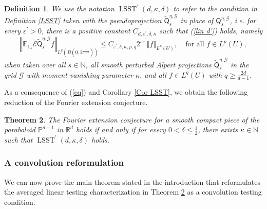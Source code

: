 \documentclass{amsart}%
\newtheorem{theorem}{Theorem}
\theoremstyle{plain}
\newtheorem{definition}[theorem]{Definition}
\numberwithin{equation}{section}
\begin{document}
\begin{definition}
We use the notation $\operatorname*{LSST}^{\prime}\left(  d,\kappa
,\delta\right)  $ to refer to the condition in Definition \ref{LSST} taken
with the pseudoprojection $\widetilde{\mathsf{Q}}_{s}^{\eta,\mathcal{G}}$ in
place of $\mathsf{Q}_{s}^{\eta,\mathcal{G}}$, i.e. for every $\varepsilon
^{\prime}>0$, there is a positive constant $C_{d,\varepsilon^{\prime}%
,\delta,\kappa}$ such that (\ref{lin d'}) holds, namely%
\begin{equation}
\left\Vert \mathbb{E}_{\mathbb{T}_{s}}\mathcal{E}\widetilde{\mathsf{Q}}%
_{s}^{\eta,\mathcal{G}}f\right\Vert _{L^{q}\left(  B\left(  0,2^{\frac
{s}{1-\delta}}\right)  \right)  }\leq C_{\varepsilon^{\prime},\delta
,\kappa,p,q}2^{s\varepsilon^{\prime}}\left\Vert f\right\Vert _{L^{p}\left(
U\right)  },\ \ \ \ \ \text{for all }f\in L^{p}\left(  U\right)
,\label{lind''}%
\end{equation}
when taken over all $s\in\mathbb{N}$, all smooth perturbed Alpert projections
$\widetilde{\mathsf{Q}}_{s}^{\eta,\mathcal{G}}$ in the grid $\mathcal{G}$ with
moment vanishing parameter $\kappa$, and all $f\in L^{q}\left(  U\right)  $
with $q\geq\frac{2d}{d-1}$.
\end{definition}

As a consequence of (\ref{eq}) and Corollary \ref{Cor LSST}, we obtain the
following reduction of the Fourier extension conjecture.

\begin{theorem}
\label{Thm LSST'}The Fourier extension conjecture for a smooth compact piece
of the paraboloid $\mathbb{P}^{d-1}$ in $\mathbb{R}^{d}$ holds if and only if
for every $0<\delta\leq\frac{1}{2}$, there exists $\kappa\in\mathbb{N} $ such
that $\operatorname*{LSST}^{\prime}\left(  d,\kappa,\delta\right)  $ holds.
\end{theorem}

\subsubsection{A convolution reformulation}

We can now prove the main theorem stated in the introduction that reformulates
the averaged linear testing characterization in Theorem \ref{Thm LSST'} as a
convolution testing condition.
\end{document}
